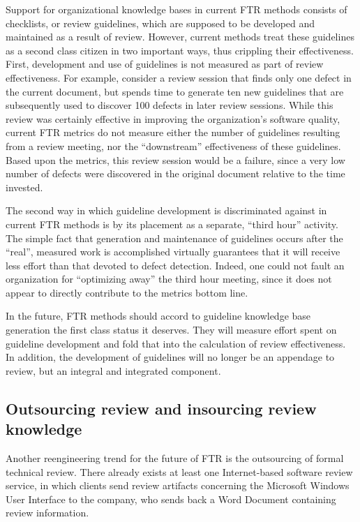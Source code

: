 Support for organizational knowledge bases in current FTR methods consists
of checklists, or review guidelines, which are supposed to be developed and
maintained as a result of review. However, current methods treat these
guidelines as a second class citizen in two important ways, thus crippling
their effectiveness.  First, development and use of guidelines is not
measured as part of review effectiveness.  For example, consider a review
session that finds only one defect in the current document, but spends time
to generate ten new guidelines that are subsequently used to discover 100
defects in later review sessions.  While this review was certainly
effective in improving the organization's software quality, current FTR
metrics do not measure either the number of guidelines resulting from a
review meeting, nor the ``downstream'' effectiveness of these
guidelines. Based upon the metrics, this review session would be a failure,
since a very low number of defects were discovered in the original document
relative to the time invested.

The second way in which guideline development is discriminated against in
current FTR methods is by its placement as a separate, ``third hour''
activity. The simple fact that generation and maintenance of guidelines
occurs after the ``real'', measured work is accomplished virtually
guarantees that it will receive less effort than that devoted to defect
detection. Indeed, one could not fault an organization for ``optimizing
away'' the third hour meeting, since it does not appear to directly
contribute to the metrics bottom line.

In the future, FTR methods should accord to guideline knowledge base
generation the first class status it deserves.  They will measure effort
spent on guideline development and fold that into the calculation of 
review effectiveness. In addition, the development of guidelines will
no longer be an appendage to review, but an integral and integrated 
component.


\subsection*{Outsourcing review and insourcing review knowledge}

Another reengineering trend for the future of FTR is the outsourcing of
formal technical review.  There already exists at least one Internet-based
software review service, in which clients send review artifacts concerning
the Microsoft Windows User Interface to the company, who sends back a Word
Document containing review information.

